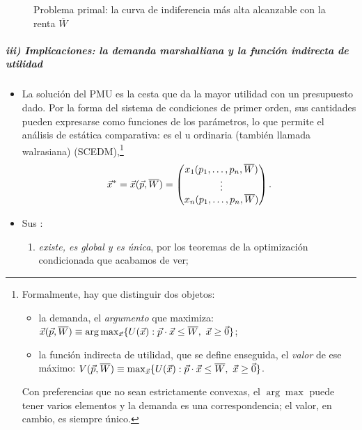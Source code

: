 \documentclass[11pt]{article}
\begin{document}
\begin{figure}[H]
\centering
\caption{Problema primal: la curva de indiferencia más alta alcanzable con la renta $\overline{W}$}\label{fig:primal}
\end{figure}

\subparagraph{iii) Implicaciones: la demanda marshalliana y la función indirecta de utilidad}

\begin{itemize}
\item La solución del PMU es la cesta que da la mayor utilidad con un presupuesto dado. Por la forma del sistema de condiciones de primer orden, sus cantidades pueden expresarse como funciones de los parámetros, lo que permite el análisis de estática comparativa: es el  u ordinaria (también llamada walrasiana) (SCEDM),\footnote{Formalmente, hay que distinguir dos objetos:
\begin{itemize}
\item la demanda, el \emph{argumento} que maximiza: $\vect{x}(\vect{p},\overline{W})\equiv\arg\max_{\vect{x}}\{U(\vect{x}):\vect{p}\cdot\vect{x}\leq\overline{W},\ \vect{x}\geq\vect{0}\}$;
\item la función indirecta de utilidad, que se define enseguida, el \emph{valor} de ese máximo: $V(\vect{p},\overline{W})\equiv\max_{\vect{x}}\{U(\vect{x}):\vect{p}\cdot\vect{x}\leq\overline{W},\ \vect{x}\geq\vect{0}\}$.
\end{itemize}
Con preferencias que no sean estrictamente convexas, el $\arg\max$ puede tener varios elementos y la demanda es una correspondencia; el valor, en cambio, es siempre único.}
  \begin{equation}
  \vec{x}^*=\vec{x}(\vec{p},\overline{W})=\begin{pmatrix} x_1(p_1,\dots,p_n,\overline{W})\\ \vdots\\ x_n(p_1,\dots,p_n,\overline{W})\end{pmatrix}. \label{eq:marshalliana}
  \end{equation}
\item Sus \nocite{MasColellWhinstonGreen1995,JehleReny2011Advanced}:
  \begin{enumerate}
  \item \emph{existe, es global y es única}, por los teoremas de la optimización condicionada que acabamos de ver;

\end{enumerate}
\end{itemize}
\end{document}
